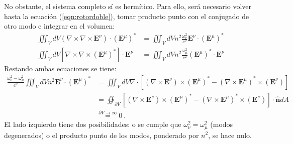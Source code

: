 No obstante, el sistema completo sí es hermítico. Para ello, será necesario volver hasta la ecuación (\ref{eqn:rotordoble}), tomar producto punto con el conjugado de otro modo e integrar en el volumen:
\begin{align*}
	\iiint_V dV \left(\nabla\times\nabla\times\textbf{E}^\nu \right)  \cdot \left(\textbf{E}^\mu\right)^* &= \iiint_V dV n^2\frac{\omega_\nu^2}{c^2} \textbf{E}^\nu \cdot \left(\textbf{E}^\mu\right)^*
	\\
	\iiint_V dV \left[\nabla\times\nabla\times\left(\textbf{E}^\mu\right)^* \right]  \cdot \textbf{E}^\nu &= \iiint_V dV n^2 \frac{\omega_\mu^2}{c^2} \left(\textbf{E}^\mu\right)^* \cdot \textbf{E}^\nu  
\end{align*}
Restando ambas ecuaciones se tiene:
\begin{align*}
	\frac{ \omega_\nu^2 - \omega_\mu^2}{c^2} \iiint_V dV n^2 \textbf{E}^\nu \cdot \left(\textbf{E}^\mu\right)^*
	&= \iiint_V dV \nabla \cdot \left[ \left(\nabla\times\textbf{E}^\nu\right) \times \left(\textbf{E}^\mu \right)^* - \left(\nabla\times\textbf{E}^\mu\right)^* \times \left(\textbf{E}^\nu \right) \right]
	\\
	&= \oiint_{\partial V}  \left[ \left(\nabla\times\textbf{E}^\nu\right) \times \left(\textbf{E}^\mu \right)^* - \left(\nabla\times\textbf{E}^\mu\right)^* \times \left(\textbf{E}^\nu \right) \right] \cdot \hat{\textbf{n}} dA
	\\
	&\overset{\partial V \to \infty}{=}
	0 \ .
\end{align*}
El lado izquierdo tiene dos posibilidades: o se cumple que $\omega_\nu^2 = \omega_\mu^2$ (modos degenerados) o el producto punto de los modos, ponderado por $n^2$, se hace nulo.